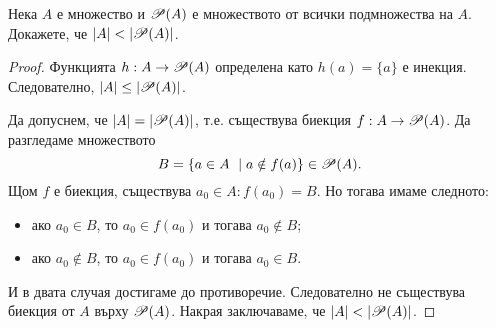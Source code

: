 \begin{thm}
  Нека $A$ е множество и $\mathscr{P}(A)$ е множеството от всички подмножества на $A$.
  Докажете, че $|A| < |\mathscr{P}(A)|$.
\end{thm}
\begin{proof}
  Функцията $h:A \to \mathscr{P}(A)$ определена като $h(a) = \{a\}$ е инекция.
  Следователно, $\lvert{A}\rvert \leq \lvert{\mathscr{P}(A)}\rvert$.

  Да допуснем, че $\lvert{A}\rvert = \lvert{\mathscr{P}(A)}\rvert$, т.е. 
  съществува биекция $f:A\rightarrow \mathscr{P}(A)$.
  Да разгледаме множеството \[B=\{a\in A\ \mid a\notin f(a)\}\in\mathscr{P}(A).\]
  Щом $f$ е биекция, съществува $a_0\in A: f(a_0) = B$.
  Но тогава имаме следното:
  \begin{itemize}
  \item
    ако $a_0\in B$, то $a_0 \in f(a_0)$ и тогава $a_0\not\in B$;
  \item
    ако $a_0\not\in B$, то $a_0 \in f(a_0)$ и тогава $a_0\in B$.
  \end{itemize}
  И в двата случая достигаме до противоречие.
  Следователно не съществува биекция от $A$ върху $\mathscr{P}(A)$.
  Накрая заключаваме, че $\lvert{A}\rvert < \lvert{\mathscr{P}(A)}\rvert$.
\end{proof}

